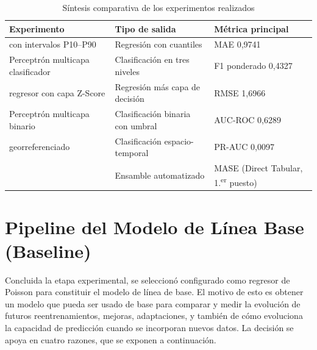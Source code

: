 \begin{table}[htbp]
\centering
\caption{Síntesis comparativa de los experimentos realizados}
\label{tab:sintesis-experimentos}
\begin{tabularx}{\linewidth}{@{}XXl@{}}
\toprule
\textbf{Experimento} & \textbf{Tipo de salida} & \textbf{Métrica principal} \\
\midrule
\lightgbm{} con intervalos P10--P90 & Regresión con cuantiles & MAE 0,9741 \\
Perceptrón multicapa clasificador & Clasificación en tres niveles & F1 ponderado 0,4327 \\
\xgboost{} regresor con capa Z-Score & Regresión más capa de decisión & RMSE 1,6966 \\
Perceptrón multicapa binario & Clasificación binaria con umbral & AUC-ROC 0,6289 \\
\xgboost{} georreferenciado & Clasificación espacio-temporal & PR-AUC 0,0097 \\
\autogluonts{} & Ensamble automatizado & MASE (Direct Tabular, 1.\textsuperscript{er} puesto) \\
\bottomrule
\end{tabularx}
\end{table}

\section{Pipeline del Modelo de Línea Base (Baseline)}\label{pipeline-del-modelo-de-luxednea-base-baseline}


Concluida la etapa experimental, se seleccionó \xgboost{} configurado como regresor de Poisson para constituir el modelo de línea de base. El motivo de esto es obtener un modelo que pueda ser usado de base para comparar y medir la evolución de futuros reentrenamientos, mejoras, adaptaciones, y también de cómo evoluciona la capacidad de predicción cuando se incorporan nuevos datos. La decisión se apoya en cuatro razones, que se exponen a continuación.

